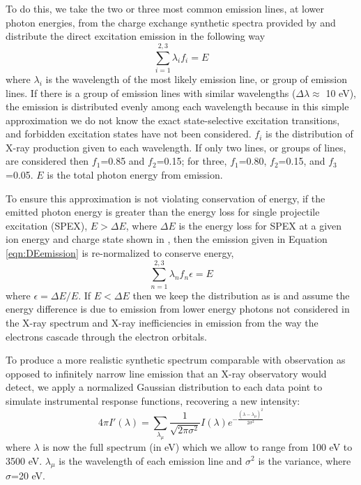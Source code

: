 \documentclass[draft]{agujournal2018}
\begin{document}
To do this, we take the two or three most common emission lines, at lower photon energies, from the charge exchange synthetic spectra provided by \citet{hui2010} and distribute the direct excitation emission in the following way
\begin{equation}
    \sum_{i=1}^{2,3}\lambda_{i}f_{i}=E
    \label{eqn:DEemission}
\end{equation}
where $\lambda_{i}$ is the wavelength of the most likely emission line, or group of emission lines.
If there is a group of emission lines with similar wavelengths ($\Delta\lambda\approx$ 10 eV), the emission is distributed evenly among each wavelength because in this simple approximation we do not know the exact state-selective excitation transitions, and forbidden excitation states have not been considered.
$f_{i}$ is the distribution of X-ray production given to each wavelength.
If only two lines, or groups of lines, are considered then $f_{1}$=0.85 and $f_{2}$=0.15; for three, $f_{1}$=0.80, $f_{2}$=0.15, and $f_{3}$=0.05.
$E$ is the total photon energy from emission.

To ensure this approximation is not violating conservation of energy, if the emitted photon energy is greater than the energy loss for single projectile excitation (SPEX), $E>\Delta E$, where $\Delta E$ is the energy loss for SPEX at a given ion energy and charge state shown in \citet{schultz2019}, then the emission given in Equation \ref{eqn:DEemission} is re-normalized to conserve energy,
\begin{equation}
    \sum_{n=1}^{2,3}\lambda_{n}f_{n}\epsilon=E
\end{equation}
where $\epsilon=\Delta E/E$.
If $E<\Delta E$ then we keep the distribution as is and assume the energy difference is due to emission from lower energy photons not considered in the X-ray spectrum and X-ray inefficiencies in emission from the way the electrons cascade through the electron orbitals.

To produce a more realistic synthetic spectrum comparable with observation as opposed to infinitely narrow line emission that an X-ray observatory would detect, we apply a normalized Gaussian distribution to each data point to simulate instrumental response functions, recovering a new intensity:
\begin{equation}
    4\pi I'(\lambda)=\sum_{\lambda_{\mu}}\frac{1}{\sqrt{2\pi\sigma^2}}I(\lambda)e^{-\frac{(\lambda-\lambda_{\mu})^2}{2\sigma^2}}
\end{equation}
where $\lambda$ is now the full spectrum (in eV) which we allow to range from 100 eV to 3500 eV. $\lambda_{\mu}$ is the wavelength of each emission line and $\sigma^2$ is the variance, where $\sigma$=20 eV.
\end{document}
